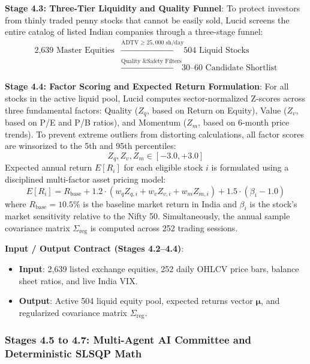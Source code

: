 \noindent \textbf{Stage 4.3: Three-Tier Liquidity and Quality Funnel}:
To protect investors from thinly traded penny stocks that cannot be easily sold, Lucid screens the entire catalog of listed Indian companies through a three-stage funnel:
\begin{equation}
\begin{aligned}
\text{2,639 Master Equities} &\xrightarrow{\text{ADTV} \ge 25,000 \text{ sh/day}} \text{504 Liquid Stocks} \\
&\xrightarrow{\text{Quality \& Safety Filters}} \text{30--60 Candidate Shortlist}
\end{aligned}
\end{equation}

\noindent \textbf{Stage 4.4: Factor Scoring and Expected Return Formulation}:
For all stocks in the active liquid pool, Lucid computes sector-normalized Z-scores across three fundamental factors: Quality ($Z_q$, based on Return on Equity), Value ($Z_v$, based on P/E and P/B ratios), and Momentum ($Z_m$, based on 6-month price trends). To prevent extreme outliers from distorting calculations, all factor scores are winsorized to the 5th and 95th percentiles:
\begin{equation}
Z_q, Z_v, Z_m \in [-3.0, +3.0]
\end{equation}
Expected annual return $E[R_i]$ for each eligible stock $i$ is formulated using a disciplined multi-factor asset pricing model:
\begin{equation}
E[R_i] = R_{\text{base}} + 1.2 \cdot \left( w_q Z_{q,i} + w_v Z_{v,i} + w_m Z_{m,i} \right) + 1.5 \cdot (\beta_i - 1.0)
\end{equation}
where $R_{\text{base}} = 10.5\%$ is the baseline market return in India and $\beta_i$ is the stock's market sensitivity relative to the Nifty 50. Simultaneously, the annual sample covariance matrix $\Sigma_{\text{reg}}$ is computed across 252 trading sessions.

\noindent \textbf{Input / Output Contract (Stages 4.2--4.4)}:
\begin{itemize}
    \item \textbf{Input}: 2,639 listed exchange equities, 252 daily OHLCV price bars, balance sheet ratios, and live India VIX.
    \item \textbf{Output}: Active 504 liquid equity pool, expected returns vector $\boldsymbol{\mu}$, and regularized covariance matrix $\Sigma_{\text{reg}}$.
\end{itemize}

\subsubsection{Stages 4.5 to 4.7: Multi-Agent AI Committee and Deterministic SLSQP Math}


